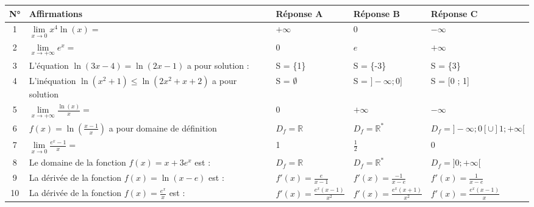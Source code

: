 \documentclass[12pt,a4paper]{article}
\begin{document}
\raggedright
\begin{tabular}{|c|p{6cm}|p{3.2cm}|p{3.2cm}|p{4.2cm}|}
\hline
N° & Affirmations & Réponse A & Réponse B & Réponse C \\
\hline
1 & $\lim\limits_{x \to 0} x^4 \ln(x) =$ & $+\infty$ & $0$ & $-\infty$ \\
\hline
2 & $\lim\limits_{x \to +\infty} e^x = $ & $0$ & $ e$ & $+\infty$  \\
\hline
3 & \makecell[l]{L'équation $\ln(3x-4) = \ln(2x - 1)$\\ a pour solution :} & S = \{1\} & S = \{-3\} & S = \{3\}  \\
\hline
4 & \makecell[l]{L'inéquation\\ $\ln(x^2 +1)\leq \ln(2x^2 + x+ 2) $\\ 
  a pour solution} & S = $\emptyset$ & S = $]-\infty ; 0]$ & S = [0 ; 1]  \\
\hline 
5 & $\lim\limits_{x \to +\infty} \frac{\ln(x)}{x} = $ & $0$ & $+\infty$ & $-\infty $  \\
\hline
6 & \makecell[l]{$f(x) = \ln\left( \frac{x-1}{x}\right) $ a pour\\ domaine de définition} & $D_f = \mathbb{R}$  & $D_f = \mathbb{R^*}$ & $D_f  = ]-\infty ;0[ \cup ]1 ; +\infty[$  \\
\hline
7 &  $\lim\limits_{x \to 0} \frac{e^x -1}{x}=$ & 1 & $\frac{1}{2}$ & $0$  \\
\hline
8 & \makecell[l]{Le domaine de la fonction\\ $f(x)= x+3e^x $ est :} & $D_f = \mathbb{R}$ & $D_f = \mathbb{R^*} $ & $D_f = ]0 ; +\infty[ $  \\
\hline 
9 & \makecell[l]{La dérivée de la fonction\\ $f(x) = \ln(x-e)$ est :}  & $f'(x) = \frac{e}{x-1}$ &  $f'(x) = \frac{-1}{x-e}$ &  $f'(x) = \frac{1}{x-e}$ \\
\hline
10 & La dérivée de la fonction $f(x) = \frac{e^x}{x}$ est : & $f'(x) = \frac{e^x(x-1)}{x^2}$  & $f'(x)= \frac{e^x(x+1)}{x^2}$  & $f'(x)= \frac{e^x(x-1)}{x}$\\
\hline
\end{tabular}
\end{document}

